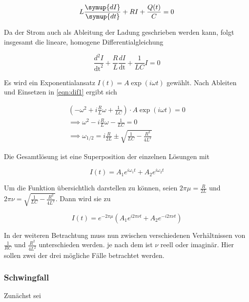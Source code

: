    \begin{equation*}
        L \frac{\symup{dI}}{\symup{dt}} + R I + \frac{Q(t)}{C} = 0
    \end{equation*}
    
    \noindent Da der Strom auch als Ableitung der Ladung geschrieben werden
    kann, folgt insgesamt die lineare, homogene Differentialgleichung
    
    \begin{equation}
        \frac{d^2 I}{\text{dt}^2} + \frac{R}{L} \frac{dI}{\text{dt}}
        + \frac{1}{LC} I = 0
        \label{eqn:dif1}
    \end{equation}
    
    \noindent Es wird ein Exponentialansatz $I(t) = A \exp(i \omega t)$ 
    gewählt. Nach Ableiten und Einsetzen in \eqref{eqn:dif1} ergibt sich

    \begin{align*}
        \left( -\omega^2 + i \frac{R}{L} \omega + \frac{1}{LC}\right) \cdot A \exp(i \omega t) = 0\\
        \implies \omega^2 - i \frac{R}{L} \omega - \frac{1}{LC} = 0\\
        \implies \omega_{1/2} = i \frac{R}{2L} \pm \sqrt{\frac{1}{LC} - \frac{R^2}{4L^2}}
    \end{align*}

    \noindent Die Gesamtlösung ist eine Superposition der einzelnen Lösungen
    mit 

    \begin{equation*}
        I(t) = A_1 e^{i \omega_1 t} + A_2 e^{i \omega_2 t}
    \end{equation*}

    \noindent Um die Funktion übersichtlich darstellen zu können, seien
    $2 \pi \mu = \frac{R}{2L}$ und $2 \pi \nu = \sqrt{\frac{1}{LC} - \frac{R^2}{4L^2}}$. 
    Dann wird sie zu 

    \begin{equation*}
        I(t) = e^{-2 \pi \mu} \left( A_1 e^{i 2 \pi \nu t} + A_2 e^{-i 2 \pi \nu t}\right)
    \end{equation*}

    \noindent In der weiteren Betrachtung muss nun zwischen verschiedenen
    Verhältnissen von $\frac{1}{RC}$ und $\frac{R^2}{4L^2}$ unterschieden werden.
    je nach dem ist $\nu$ reell oder imaginär. Hier sollen zwei der drei 
    mögliche Fälle betrachtet werden.

    \subsubsection{Schwingfall}
    Zunächst sei
    
